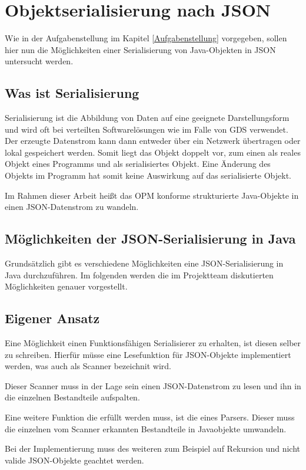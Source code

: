 \section{Objektserialisierung nach JSON}
Wie in der Aufgabenstellung im Kapitel \ref{Aufgabenstellung} vorgegeben, sollen hier nun die M\"oglichkeiten einer Serialisierung von Java-Objekten in \ac{JSON} untersucht werden.

\subsection{Was ist Serialisierung}
Serialisierung ist die Abbildung von Daten auf eine geeignete Darstellungsform und wird oft bei verteilten Softwarel\"osungen wie im Falle von \ac{GDS} verwendet. Der erzeugte Datenstrom kann dann entweder \"uber ein Netzwerk \"ubertragen oder lokal gespeichert werden. Somit liegt das Objekt doppelt vor, zum einen als reales Objekt eines Programms und als serialisiertes Objekt. Eine \"Anderung des Objekts im Programm hat somit keine Auswirkung auf das serialisierte Objekt. \cite{WikiSeri}

Im Rahmen dieser Arbeit hei\ss{}t das \ac{OPM} konforme strukturierte Java-Objekte in einen \ac{JSON}-Datenstrom zu wandeln. 

\subsection{M\"oglichkeiten der JSON-Serialisierung in Java}
Grunds\"atzlich gibt es verschiedene M\"oglichkeiten eine \ac{JSON}-Serialisierung in Java 
durchzuf\"uhren. Im folgenden werden die im Projektteam diskutierten M\"oglichkeiten genauer vorgestellt. 

\subsection{Eigener Ansatz}
Eine M\"oglichkeit einen Funktionsf\"ahigen Serialisierer zu erhalten, ist diesen selber zu schreiben. Hierf\"ur m\"usse eine Lesefunktion f\"ur \ac{JSON}-Objekte implementiert werden, was auch als Scanner bezeichnit wird. 

Dieser Scanner muss in der Lage sein einen \ac{JSON}-Datenstrom zu lesen und ihn in die einzelnen Bestandteile aufspalten.

Eine weitere Funktion die erf\"ullt werden muss, ist die eines Parsers. Dieser muss die einzelnen vom Scanner erkannten Bestandteile in Javaobjekte umwandeln.

Bei der Implementierung muss des weiteren zum Beispiel auf Rekursion und nicht valide \ac{JSON}-Objekte geachtet werden.
